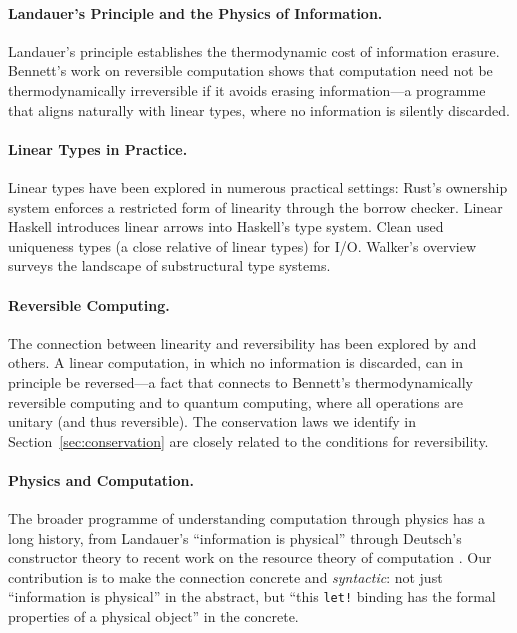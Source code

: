 \documentclass[11pt,a4paper]{article}
\begin{document}
\paragraph{Landauer's Principle and the Physics of Information.}
Landauer's principle \citep{landauer1961irreversibility} establishes
the thermodynamic cost of information erasure. Bennett's work on
reversible computation \citep{bennett1973logical} shows that
computation need not be thermodynamically irreversible if it avoids
erasing information---a programme that aligns naturally with linear
types, where no information is silently discarded.

\paragraph{Linear Types in Practice.}
Linear types have been explored in numerous practical settings:
Rust's ownership system \citep{jung2017rustbelt} enforces a
restricted form of linearity through the borrow checker. Linear
Haskell \citep{bernardy2018linear} introduces linear arrows into
Haskell's type system. Clean \citep{plasmeijer1993clean}
used uniqueness types (a close relative of linear types) for I/O.
Walker's overview \citep{walker2005substructural} surveys the
landscape of substructural type systems.

\paragraph{Reversible Computing.}
The connection between linearity and reversibility has been explored
by \citet{james2012isomorphic} and others. A linear computation, in
which no information is discarded, can in principle be reversed---a
fact that connects to Bennett's thermodynamically reversible
computing and to quantum computing, where all operations are unitary
(and thus reversible). The conservation laws we identify in
Section~\ref{sec:conservation} are closely related to the conditions
for reversibility.

\paragraph{Physics and Computation.}
The broader programme of understanding computation through physics
has a long history, from Landauer's ``information is physical''
\citep{landauer1961irreversibility} through Deutsch's constructor
theory \citep{deutsch2013constructor} to recent work on the resource
theory of computation \citep{coecke2016categorical}. Our
contribution is to make the connection concrete and
\emph{syntactic}: not just ``information is physical'' in the
abstract, but ``this \texttt{let!} binding has the formal properties
of a physical object'' in the concrete.
\end{document}

